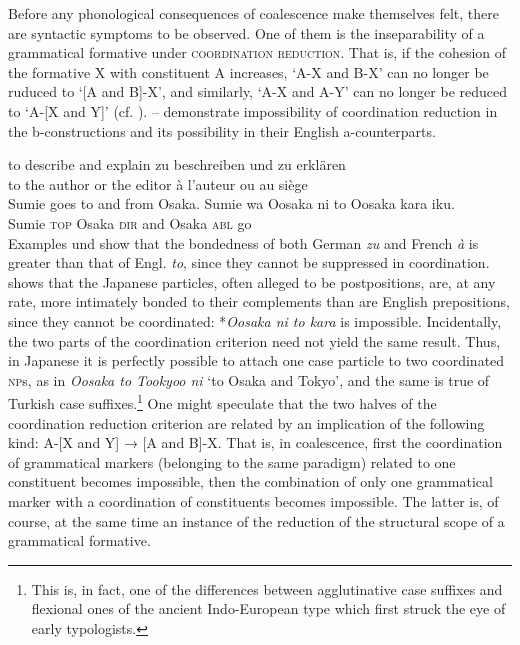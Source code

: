 Before any phonological consequences of coalescence make themselves felt, there are syntactic symptoms to be observed. One of them is the inseparability of a grammatical formative under \textsc{coordination reduction}. That is, if the cohesion of the formative X with constituent A increases, ‘A-X and B-X’ can no longer be ruduced to ‘[A and B]-X’, and similarly, ‘A-X and A-Y’ can no longer be reduced to ‘A-[X and Y]’ (cf. \citealt[198--201]{MallinsonEtAl1981}).  --  demonstrate impossibility of coordination reduction in the b-constructions and its possibility in their English a-counterparts.
 
\ea\label{ex:E105}
\langinfo{\LangGerm}{}{} 
 \ea to describe and explain 
 \ex zu beschreiben und zu erklären
\z
\z
\noindent \ea\label{ex:E106}
\langinfo{\LangFren}{}{} \\

\ea to the author or the editor
\ex à l'auteur ou au siège
\z
\z
\noindent \ea\label{ex:E107}
\\
 \ea  Sumie goes to and from Osaka. 
\ex
\gll Sumie  wa  Oosaka  ni  to  Oosaka  kara  iku.\\
   Sumie  \textsc{top}  Osaka  \textsc{dir}  and  Osaka  \textsc{abl}  go\\
\z
\z
\noindent \label{page161}Examples  und  show that the bondedness of both German \textit{zu} and French \textit{à} is greater than that of Engl. \textit{to}, since they cannot be suppressed in coordination.  shows that the Japanese particles, often alleged to be postpositions, are, at any rate, more intimately bonded to their complements than are English prepositions, since they cannot be coordinated: *\textit{Oosaka ni to kara} is impossible. Incidentally, the two parts of the coordination criterion need not yield the same result. Thus, in Japanese it is perfectly possible to attach one case particle to two coordinated \textsc{np}s, as in \textit{Oosaka to Tookyoo ni} ‘to Osaka and Tokyo’, and the same is true of Turkish case suffixes.\footnote{This is, in fact, one of the differences between agglutinative case suffixes and flexional ones of the ancient Indo-European type which first struck the eye of early typologists.} One might speculate that the two halves of the coordination reduction criterion are related by an implication of the following kind: A-[X and Y] → [A and B]-X. That is, in coalescence, first the coordination of grammatical markers (belonging to the same paradigm) related to one constituent becomes impossible, then the combination of only one grammatical marker with a coordination of constituents becomes impossible. The latter is, of course, at the same time an instance of the reduction of the structural scope of a grammatical formative.\label{page161b}

